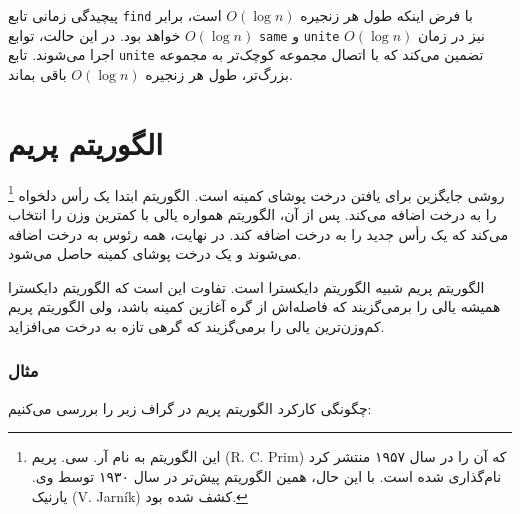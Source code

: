 پیچیدگی زمانی تابع \texttt{find}
با فرض اینکه طول هر زنجیره $O(\log n)$ است،
برابر $O(\log n)$ خواهد بود.
در این حالت، توابع \texttt{same} و \texttt{unite} نیز
در زمان $O(\log n)$ اجرا می‌شوند.
تابع \texttt{unite} تضمین می‌کند که با اتصال
مجموعه کوچک‌تر به مجموعه بزرگ‌تر،
طول هر زنجیره $O(\log n)$ باقی بماند.

\section{الگوریتم پریم}


\footnote{این الگوریتم به نام
آر. سی. پریم (R. C. Prim) که آن را در سال ۱۹۵۷ منتشر کرد \cite{pri57}
نام‌گذاری شده است. با این حال، همین الگوریتم پیش‌تر در سال ۱۹۳۰
توسط وی. یارنیک (V. Jarník) کشف شده بود.} روشی جایگزین
برای یافتن درخت پوشای کمینه است.
الگوریتم ابتدا یک رأس دلخواه را
به درخت اضافه می‌کند.
پس از آن، الگوریتم همواره یالی با کمترین وزن را
انتخاب می‌کند که یک رأس جدید را به درخت اضافه کند.
در نهایت، همه رئوس به درخت اضافه می‌شوند
و یک درخت پوشای کمینه حاصل می‌شود.

الگوریتم پریم شبیه الگوریتم دایکسترا است. تفاوت این است که الگوریتم دایکسترا همیشه یالی را برمی‌گزیند که فاصله‌اش از گره آغازین کمینه باشد، ولی الگوریتم پریم کم‌وزن‌ترین یالی را برمی‌گزیند که گرهی تازه به درخت می‌افزاید.

\subsubsection{مثال}

چگونگی کارکرد الگوریتم پریم در گراف زیر را بررسی می‌کنیم:


